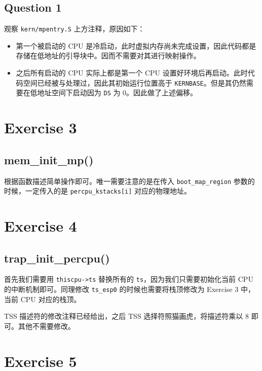 \documentclass[11pt]{article}
\begin{document}
	\subsection*{Question 1}
	
		\par 观察 \texttt{kern/mpentry.S} 上方注释，原因如下：
		
		\begin{itemize}
			\item 第一个被启动的 CPU 是冷启动，此时虚拟内存尚未完成设置，因此代码都是存储在低地址的引导块中。因而不需要对其进行映射操作。
			
			\item 之后所有启动的 CPU 实际上都是第一个 CPU 设置好环境后再启动。此时代码空间已经被与处理过，因此其初始运行位置高于 \texttt{KERNBASE}。但是其仍然需要在低地址空间下启动因为 \texttt{DS} 为 0。因此做了上述偏移。
		\end{itemize}
	\section{Exercise 3}
	
	\subsection*{mem\_init\_mp()}
	
		\par 根据函数描述简单操作即可。唯一需要注意的是在传入 \texttt{boot\_map\_region} 参数的时候，一定传入的是 \texttt{percpu\_kstacks[i]} 对应的物理地址。
		
	\section{Exercise 4}
	
	\subsection*{trap\_init\_percpu()}
	
	\par 首先我们需要用 \texttt{thiscpu->ts} 替换所有的 \texttt{ts}，因为我们只需要初始化当前 CPU 的中断机制即可。同理修改 \texttt{ts\_esp0} 的时候也需要将栈顶修改为 Exercise 3 中，当前 CPU 对应的栈顶。
	
	\par TSS 描述符的修改注释已经给出，之后 TSS 选择符照猫画虎，将描述符乘以 8 即可。其他不需要修改。
	
	\section{Exercise 5}
	
\end{document}
